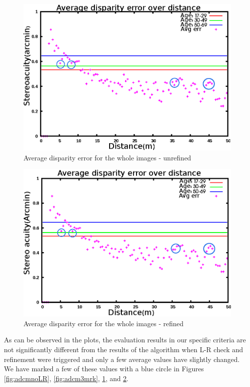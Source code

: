 \begin{figure}[H]
\centering
\includegraphics[scale=0.95]{adcenfull3NoLRmrk}
\caption{Average disparity error for the whole images - unrefined}
\label{fig:adcfnoLR}
\end{figure} 

\begin{figure}[H]
\centering
\includegraphics[scale=0.95]{adcenfull3mrk}
\caption{Average disparity error for the whole images - refined}
\label{fig:adcf3mrk}
\end{figure} 

As can be observed in the plots, the evaluation results in our specific criteria 
are not significantly different from the results of the algorithm when L-R check and refinement were triggered
and only a few average values have slightly changed. We have marked a few of these values with a blue circle in Figures \ref{fig:adcmnoLR}, \ref{fig:adcm3mrk}, 
\ref{fig:adcfnoLR}, and \ref{fig:adcf3mrk}.

